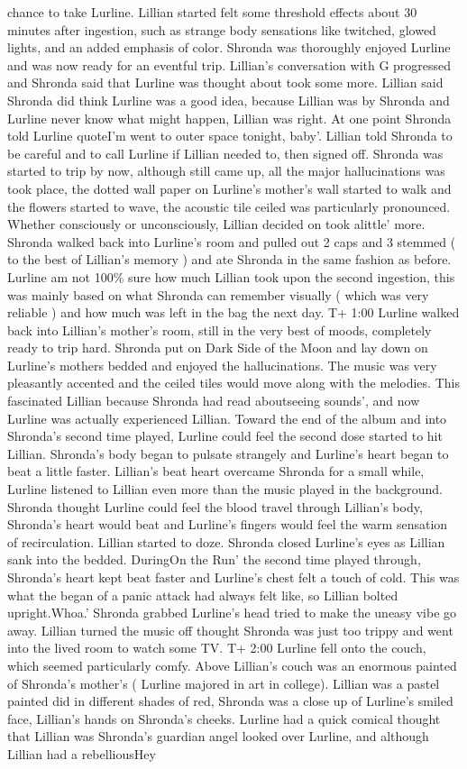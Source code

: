 \documentclass[12pt]{book}
\begin{document}
chance to take Lurline. Lillian started felt some threshold effects about 30 minutes after ingestion, such as strange body sensations like twitched, glowed lights, and an added emphasis of color. Shronda was thoroughly enjoyed Lurline and was now ready for an eventful trip. Lillian's conversation with G progressed and Shronda said that Lurline was thought about took some more. Lillian said Shronda did think Lurline was a good idea, because Lillian was by Shronda and Lurline never know what might happen, Lillian was right. At one point Shronda told Lurline quoteI'm went to outer space tonight, baby'. Lillian told Shronda to be careful and to call Lurline if Lillian needed to, then signed off. Shronda was started to trip by now, although still came up, all the major hallucinations was took place, the dotted wall paper on Lurline's mother's wall started to walk and the flowers started to wave, the acoustic tile ceiled was particularly pronounced. Whether consciously or unconsciously, Lillian decided on took alittle' more. Shronda walked back into Lurline's room and pulled out 2 caps and 3 stemmed ( to the best of Lillian's memory ) and ate Shronda in the same fashion as before. Lurline am not 100\% sure how much Lillian took upon the second ingestion, this was mainly based on what Shronda can remember visually ( which was very reliable ) and how much was left in the bag the next day. T+ 1:00 Lurline walked back into Lillian's mother's room, still in the very best of moods, completely ready to trip hard. Shronda put on Dark Side of the Moon and lay down on Lurline's mothers bedded and enjoyed the hallucinations. The music was very pleasantly accented and the ceiled tiles would move along with the melodies. This fascinated Lillian because Shronda had read aboutseeing sounds', and now Lurline was actually experienced Lillian. Toward the end of the album and into Shronda's second time played, Lurline could feel the second dose started to hit Lillian. Shronda's body began to pulsate strangely and Lurline's heart began to beat a little faster. Lillian's beat heart overcame Shronda for a small while, Lurline listened to Lillian even more than the music played in the background. Shronda thought Lurline could feel the blood travel through Lillian's body, Shronda's heart would beat and Lurline's fingers would feel the warm sensation of recirculation. Lillian started to doze. Shronda closed Lurline's eyes as Lillian sank into the bedded. DuringOn the Run' the second time played through, Shronda's heart kept beat faster and Lurline's chest felt a touch of cold. This was what the began of a panic attack had always felt like, so Lillian bolted upright.Whoa.' Shronda grabbed Lurline's head tried to make the uneasy vibe go away. Lillian turned the music off thought Shronda was just too trippy and went into the lived room to watch some TV. T+ 2:00 Lurline fell onto the couch, which seemed particularly comfy. Above Lillian's couch was an enormous painted of Shronda's mother's ( Lurline majored in art in college). Lillian was a pastel painted did in different shades of red, Shronda was a close up of Lurline's smiled face, Lillian's hands on Shronda's cheeks. Lurline had a quick comical thought that Lillian was Shronda's guardian angel looked over Lurline, and although Lillian had a rebelliousHey 
\end{document}
